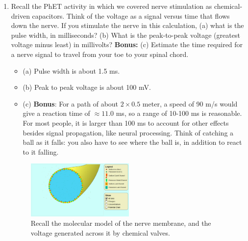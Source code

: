 \documentclass[10pt]{article}
\begin{document}
\begin{enumerate}
\item Recall the PhET activity in which we covered nerve stimulation as chemical-driven capacitors.  Think of the voltage as a signal versus time that flows down the nerve.  If you stimulate the nerve in this calculation, (a) what is the pulse width, in milliseconds?  (b) What is the peak-to-peak voltage (greatest voltage minus least) in millivolts? \textbf{Bonus:} (c) Estimate the time required for a nerve signal to travel from your toe to your spinal chord.
\begin{itemize}
\item (a) Pulse width is about 1.5 ms.
\item (b) Peak to peak voltage is about 100 mV.
\item (c) \textbf{Bonus}: For a path of about $2 \times 0.5$ meter, a speed of 90 m/s would give a reaction time of $\approx 11.0$ ms, so a range of 10-100 ms is reasonable.  For most people, it is larger than 100 ms to account for other effects besides signal propagation, like neural processing.  Think of catching a ball as it falls: you also have to see where the ball is, in addition to react to it falling.
\end{itemize}

\begin{figure}[hb]
\centering
\includegraphics[width=0.5\textwidth]{figures/neuron.png}
\caption{\label{fig:neuron} Recall the molecular model of the nerve membrane, and the voltage generated across it by chemical valves.}
\end{figure}

\end{enumerate}
\end{document}
